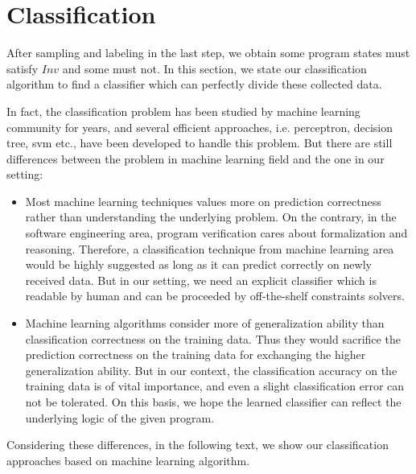 
\section{Classification} %
\label{sec:classification}

After sampling and labeling in the last step, we obtain some program states must satisfy $Inv$ and some must not. 
In this section, we state our classification algorithm to find a classifier which can perfectly divide these collected data.

In fact, the classification problem has been studied by machine learning community for years,
and several efficient approaches, i.e. perceptron, decision tree, svm etc., have been developed to handle this problem.
But there are still differences between the problem in machine learning field and the one in our setting:
\begin{itemize}
\item Most machine learning techniques values more on prediction correctness rather than understanding the underlying problem.
On the contrary, in the software engineering area, program verification cares about formalization and reasoning.
Therefore, a classification technique from machine learning area would be highly suggested as long as it can predict correctly on newly received data.
But in our setting, we need an explicit classifier which is readable by human and can be proceeded by off-the-shelf constraints solvers.

\item Machine learning algorithms consider more of generalization ability than classification correctness on the training data.
Thus they would sacrifice the prediction correctness on the training data for exchanging the higher generalization ability.
But in our context, the classification accuracy on the training data is of vital importance,
and even a slight classification error can not be tolerated.
On this basis, we hope the learned classifier can reflect the underlying logic of the given program.
\end{itemize} 
Considering these differences,
in the following text, 
we show our classification approaches based on machine learning algorithm.


